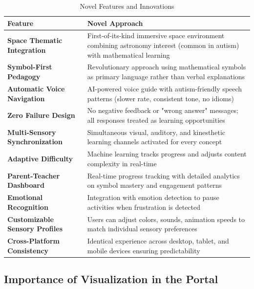 \documentclass[12pt, a4paper]{article}
\begin{document}
\begin{table}[H]
\centering
\small
\begin{tabular}{|p{5cm}|p{9cm}|}
\hline
\rowcolor{stargold!30}
\textbf{Feature} & \textbf{Novel Approach} \\
\hline
\textbf{Space Thematic Integration} & First-of-its-kind immersive space environment combining astronomy interest (common in autism) with mathematical learning \\
\hline
\textbf{Symbol-First Pedagogy} & Revolutionary approach using mathematical symbols as primary language rather than verbal explanations \\
\hline
\textbf{Automatic Voice Navigation} & AI-powered voice guide with autism-friendly speech patterns (slower rate, consistent tone, no idioms) \\
\hline
\textbf{Zero Failure Design} & No negative feedback or "wrong answer" messages; all responses treated as learning opportunities \\
\hline
\textbf{Multi-Sensory Synchronization} & Simultaneous visual, auditory, and kinesthetic learning channels activated for every concept \\
\hline
\textbf{Adaptive Difficulty} & Machine learning tracks progress and adjusts content complexity in real-time \\
\hline
\textbf{Parent-Teacher Dashboard} & Real-time progress tracking with detailed analytics on symbol mastery and engagement patterns \\
\hline
\textbf{Emotional Recognition} & Integration with emotion detection to pause activities when frustration is detected \\
\hline
\textbf{Customizable Sensory Profiles} & Users can adjust colors, sounds, animation speeds to match individual sensory preferences \\
\hline
\textbf{Cross-Platform Consistency} & Identical experience across desktop, tablet, and mobile devices ensuring predictability \\
\hline
\end{tabular}
\caption{Novel Features and Innovations}
\end{table}

\subsection{Importance of Visualization in the Portal}
\end{document}
